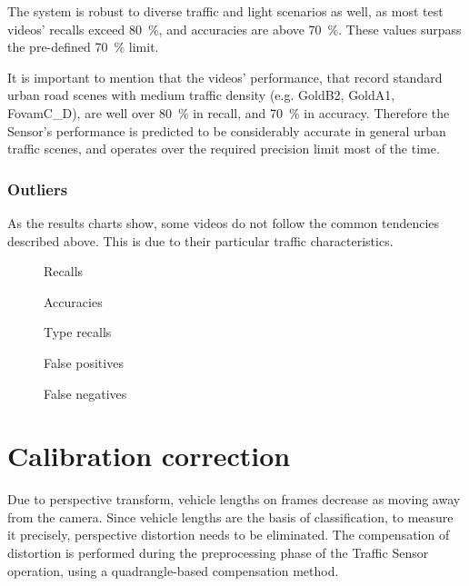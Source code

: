 The system is robust to diverse traffic and light scenarios as well, as most test videos' recalls exceed \SI{80}{\%}, and accuracies are above \SI{70}{\%}. These values surpass the pre-defined \SI{70}{\%} limit.

It is important to mention that the videos' performance, that record standard urban road scenes with medium traffic density (e.g. GoldB2, GoldA1, FovamC\_D), are well over \SI{80}{\%} in recall, and \SI{70}{\%} in accuracy.
Therefore the Sensor's performance is predicted to be considerably accurate in general urban traffic scenes, and operates over the required precision limit most of the time.

\subsubsection{Outliers}
As the results charts show, some videos do not follow the common tendencies described above.
This is due to their particular traffic characteristics.

\begin{figure}[p]
	\centering
	\caption{Recalls \label{chart:recalls}}
\end{figure}

\begin{figure}[p]
	\centering
	\caption{Accuracies \label{chart:accuracies}}
\end{figure}

\begin{figure}[p]
	\centering
	\caption{Type recalls \label{chart:type_recalls}}
\end{figure}

\begin{figure}[p]
	\centering
	\caption{False positives \label{chart:false_positives}}
\end{figure}

\begin{figure}[p]
	\centering
	\caption{False negatives \label{chart:false_negatives}}
\end{figure}

\section{Calibration correction}\label{chap:cal_corr}
Due to perspective transform, vehicle lengths on frames decrease as moving away from the camera.
Since vehicle lengths are the basis of classification, to measure it precisely, perspective distortion needs to be eliminated.
The compensation of distortion is performed during the preprocessing phase of the Traffic Sensor operation, using a quadrangle-based compensation method.

